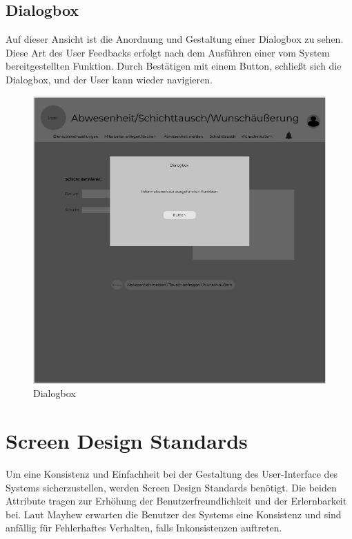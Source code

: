 \documentclass[11pt,
paper=a4,
bibtotocnumbered,	  %
liststotocnumbered,  %
DIV=calc,		  %
tablecaptionabove,	  %
headinclude,
]{article}
\begin{document}
\subsection{Dialogbox}
Auf dieser Ansicht ist die Anordnung und Gestaltung einer Dialogbox zu sehen. Diese Art des User Feedbacks erfolgt nach dem Ausführen einer vom System bereitgestellten Funktion. Durch Bestätigen mit einem Button, schließt sich die Dialogbox, und der User kann wieder navigieren.
\begin{figure}[H]
\includegraphics[scale=1]{Bilder/Dialogbox-Mockup.jpg}
\caption{Dialogbox}
\end{figure}
\section{Screen Design Standards}
Um eine Konsistenz und Einfachheit bei der Gestaltung des User-Interface des Systems sicherzustellen, werden Screen Design Standards benötigt. Die beiden Attribute tragen zur Erhöhung der Benutzerfreundlichkeit und der Erlernbarkeit bei. Laut Mayhew erwarten die Benutzer des Systems eine Konsistenz und sind anfällig für Fehlerhaftes Verhalten, falls Inkonsistenzen auftreten.
\end{document}
